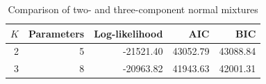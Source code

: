 \begin{table}[htbp]
\centering
\caption{Comparison of two- and three-component normal mixtures}
\label{tab:mixture-model-comparison}
\begin{tabular}{rrrrr}
\toprule
$K$ & Parameters & Log-likelihood & AIC & BIC \\
\midrule
2 & 5 & -21521.40 & 43052.79 & 43088.84 \\
3 & 8 & -20963.82 & 41943.63 & 42001.31 \\
\bottomrule
\end{tabular}
\end{table}
